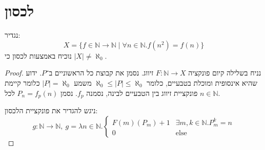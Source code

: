 \documentclass[]{article}
\newcommand\N     {\mathbb{N}}
\newcommand\other {\text{else}}
\newcommand\az    {\aleph_0}
\begin{document}
	\section{לכסון}
	נגדיר: 
	\[ X = \{ f \in \N \to \N \mid \forall n \in \N. f(n^2) = f(n) \} \]
	נוכיח באמצעות לכסון כי $|X| \neq \az$. 
	\begin{proof}
		נניח בשלילה קיום פונקציה $F \colon \N \to X$ זיווג. נסמן את קבוצת כל הראשוניים ב־$P$. ידוע שהיא אינסופית ומוכלת בטבעיים, כלומר $\az \le |P| \le \az$ משמע $|P| = \az$ כלומר קיימת פונקציית זיווג בין הטבעיים לבינה, נסמנה $f_p$. נסמן $P_n = f_p(n)$ לכל $n \in \N$. 
		
		ניגש להגדיר את פונקציית הלכסון: 
		\[ g \colon \N \to \N, \ g = \lambda n \in \N. \begin{cases}
			F(m)(P_m) + 1 &  \exists m, k \in \N. P_m^{k} = n \\
			0 & \other
		\end{cases} \]
		

\end{proof}
\end{document}
